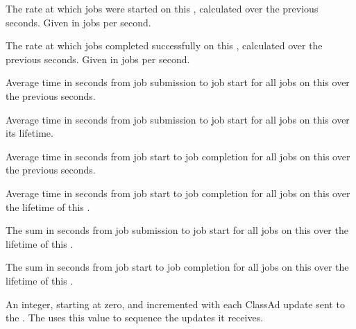 \begin{description}
\item[\AdAttr{JobStartRate}:] The rate at which jobs were started
  on this , 
  calculated over the previous  seconds.
  Given in jobs per second.

\item[\AdAttr{JobCompletionRate}:] The rate at which jobs completed
  successfully on this , 
  calculated over the previous  seconds.
  Given in jobs per second.

\item[\AdAttr{MeanTimeToStart}:] Average time in seconds
  from job submission to job start for all jobs
  on this  over the previous  seconds.

\item[\AdAttr{MeanTimeToStartCumulative}:] Average time in seconds 
  from job submission to job start 
  for all jobs on this  over its lifetime.

\item[\AdAttr{MeanRunningTime}:] Average time in seconds
  from job start to job completion for all jobs
  on this  over the previous  seconds.

\item[\AdAttr{MeanRunningTimeCumulative}:] Average time in seconds
  from job start to job completion for all jobs
  on this  over the lifetime of this .

\item[\AdAttr{SumTimeToStartCumulative}:] The sum in seconds
  from job submission to job start for all jobs 
  on this  over the lifetime of this .

\item[\AdAttr{SumRunningTimeCumulative}:] The sum in seconds
  from job start to job completion for all jobs
  on this  over the lifetime of this .

\item[\AdAttr{UpdateSequenceNumber}:] An integer, starting at zero,
  and incremented with each ClassAd update sent to the .
  The  uses this value to sequence the updates it
  receives.


\end{description}
